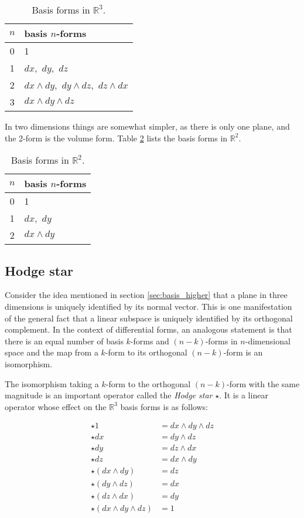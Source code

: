\documentclass[utf8,english]{gradu3}
\begin{document}
\begin{table}[h]
  \begin{tabular}{c | l}
    $n$ & basis $n$-forms \\
    \hline
    0 & 1 \\
    1 & $dx$,\, $dy$,\, $dz$ \\
    2 & $dx \wedge dy$,\, $dy \wedge dz$,\, $dz \wedge dx$ \\
    3 & $dx \wedge dy \wedge dz$ \\
  \end{tabular}
  \caption{Basis forms in $\mathbb{R}^3$.}
  \label{tab:basis_3d}
\end{table}

In two dimensions things are somewhat simpler,
as there is only one plane, and the 2-form is the volume form.
Table \ref{tab:basis_2d} lists the basis forms in $\mathbb{R}^2$.

\begin{table}[h]
  \begin{tabular}{c | l}
    $n$ & basis $n$-forms \\
    \hline
    0 & 1 \\
    1 & $dx$,\, $dy$ \\
    2 & $dx \wedge dy$ \\
  \end{tabular}
  \caption{Basis forms in $\mathbb{R}^2$.}
  \label{tab:basis_2d}
\end{table}

\subsection{Hodge star}\label{sec:hodge}

Consider the idea mentioned in section \ref{sec:basis_higher}
that a plane in three dimensions is uniquely identified by its normal vector.
This is one manifestation of the general fact that a linear subspace
is uniquely identified by its orthogonal complement.
In the context of differential forms,
an analogous statement is that there is an equal number
of basis $k$-forms and $(n-k)$-forms in $n$-dimensional space
and the map from a $k$-form to its orthogonal $(n-k)$-form
is an isomorphism.

The isomorphism taking a $k$-form to the orthogonal $(n-k)$-form
with the same magnitude is an important operator
called the \textit{Hodge star} $\star$.
It is a linear operator whose effect on the $\mathbb{R}^3$ basis forms
is as follows:

\begin{align*}
  \star 1 &= dx \wedge dy \wedge dz \\
  \star dx &= dy \wedge dz \\
  \star dy &= dz \wedge dx \\
  \star dz &= dx \wedge dy \\
  \star (dx \wedge dy) &= dz \\
  \star (dy \wedge dz) &= dx \\
  \star (dz \wedge dx) &= dy \\
  \star (dx \wedge dy \wedge dz) &= 1 \\
\end{align*}
\end{document}
